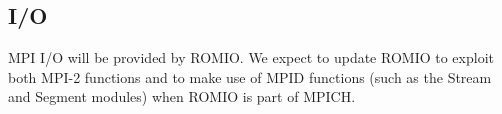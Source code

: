 \documentclass{article}
\begin{document}
\subsubsection{}
\subsubsection{}
\subsubsection{}
\subsubsection{}
\subsubsection{}
\subsubsection{}
\subsubsection{}
\subsubsection{}

\subsection{I/O}
MPI I/O will be provided by ROMIO.  We expect to update ROMIO to exploit both
MPI-2 functions and to make use of MPID functions (such as the Stream and
Segment modules) when ROMIO is part of MPICH.
\end{document}
